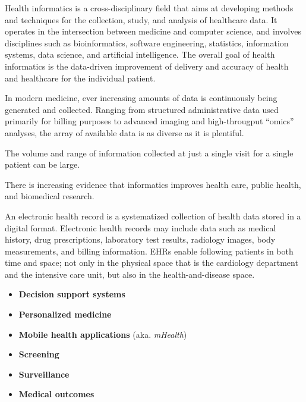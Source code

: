 Health informatics is a cross-disciplinary field
that aims at developing methods and techniques
for the collection, study, and analysis of healthcare data.
It operates in the intersection between medicine and computer science,
and involves disciplines such as
bioinformatics, software engineering, statistics, information systems,
data science, and artificial intelligence.
The overall goal of health informatics is the data-driven improvement
of delivery and accuracy of health and healthcare for the individual patient.

In modern medicine, 
ever increasing amounts of data 
is continuously being generated and collected.
Ranging from structured administrative data 
used primarily for billing purposes
to advanced imaging and high-througput \enquote{omics} analyses,
the array of available data is as diverse as it is plentiful.

The volume and range of information collected
at just a single visit for a single patient
can be large.


There is increasing evidence that informatics improves
health care, public health, and biomedical research.

    
An electronic health record
is a systematized collection of health data 
stored in a digital format.
Electronic health records may include data such as
medical history, drug prescriptions, laboratory test results,
radiology images, body measurements, and billing information.
EHRs enable following patients in both time and space;
not only in the physical space that is the cardiology department
and the intensive care unit, but also in the health-and-disease space.

\begin{itemize}
    \item \textbf{Decision support systems}
    \item \textbf{Personalized medicine}
    \item \textbf{Mobile health applications} (aka. \textit{mHealth})
    \item \textbf{Screening}
    \item \textbf{Surveillance}
    \item \textbf{Medical outcomes}
\end{itemize}


